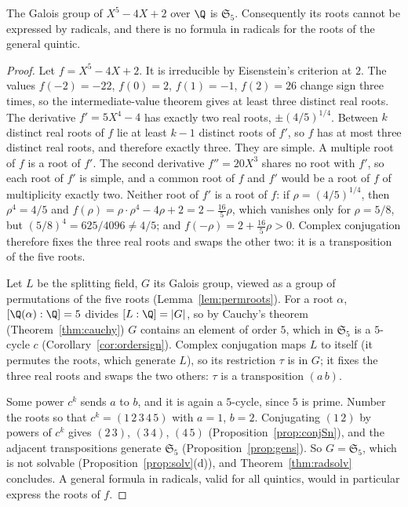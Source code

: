 \begin{theorem}\label{thm:abelruffini}
The Galois group of $X^5-4X+2$ over $\Q$ is $\mathfrak S_5$. Consequently its roots cannot be expressed by radicals, and there is no formula in radicals for the roots of the general quintic.
\end{theorem}
\begin{proof}
Let $f=X^5-4X+2$. It is irreducible by Eisenstein's criterion at $2$. The values $f(-2)=-22$, $f(0)=2$, $f(1)=-1$, $f(2)=26$ change sign three times, so the intermediate-value theorem gives at least three distinct real roots. The derivative $f'=5X^4-4$ has exactly two real roots, $\pm(4/5)^{1/4}$. Between $k$ distinct real roots of $f$ lie at least $k-1$ distinct roots of $f'$, so $f$ has at most three distinct real roots, and therefore exactly three. They are simple. A multiple root of $f$ is a root of $f'$. The second derivative $f''=20X^3$ shares no root with $f'$, so each root of $f'$ is simple, and a common root of $f$ and $f'$ would be a root of $f$ of multiplicity exactly two. Neither root of $f'$ is a root of $f$: if $\rho=(4/5)^{1/4}$, then $\rho^4=4/5$ and $f(\rho)=\rho\cdot\rho^4-4\rho+2=2-\frac{16}5\rho$, which vanishes only for $\rho=5/8$, but $(5/8)^4=625/4096\ne4/5$; and $f(-\rho)=2+\frac{16}5\rho>0$. Complex conjugation therefore fixes the three real roots and swaps the other two: it is a transposition of the five roots.

Let $L$ be the splitting field, $G$ its Galois group, viewed as a group of permutations of the five roots (Lemma~\ref{lem:permroots}). For a root $\alpha$, $[\Q(\alpha):\Q]=5$ divides $[L:\Q]=|G|$, so by Cauchy's theorem (Theorem~\ref{thm:cauchy}) $G$ contains an element of order $5$, which in $\mathfrak S_5$ is a $5$-cycle $c$ (Corollary~\ref{cor:ordersign}). Complex conjugation maps $L$ to itself (it permutes the roots, which generate $L$), so its restriction $\tau$ is in $G$; it fixes the three real roots and swaps the two others: $\tau$ is a transposition $(a\,b)$.

Some power $c^k$ sends $a$ to $b$, and it is again a $5$-cycle, since $5$ is prime. Number the roots so that $c^k=(1\,2\,3\,4\,5)$ with $a=1$, $b=2$. Conjugating $(1\,2)$ by powers of $c^k$ gives $(2\,3)$, $(3\,4)$, $(4\,5)$ (Proposition~\ref{prop:conjSn}), and the adjacent transpositions generate $\mathfrak S_5$ (Proposition~\ref{prop:gens}). So $G=\mathfrak S_5$, which is not solvable (Proposition~\ref{prop:solv}(d)), and Theorem~\ref{thm:radsolv} concludes. A general formula in radicals, valid for all quintics, would in particular express the roots of $f$.
\end{proof}

